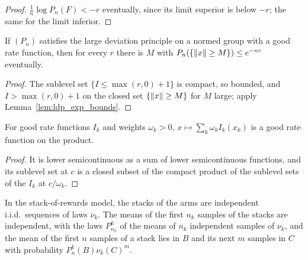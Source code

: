 \begin{proof}
  \leanok
  $\frac1n \log P_n(F) < -r$ eventually, since its limit superior is below $-r$; the same for the
  limit inferior.
\end{proof}

\begin{lemma}
  \label{lem:exp_tight}
  \leanok
  If $(P_n)$ satisfies the large deviation principle on a normed group with a good rate function,
  then for every $r$ there is $M$ with $P_n(\{\lVert x \rVert \ge M\}) \le e^{-n r}$ eventually.
\end{lemma}

\begin{proof}
  \leanok
  The sublevel set $\{I \le \max(r, 0) + 1\}$ is compact, so bounded, and $I > \max(r, 0) + 1$ on
  the closed set $\{\lVert x \rVert \ge M\}$ for $M$ large; apply Lemma~\ref{lem:ldp_exp_bounds}.
\end{proof}

\begin{lemma}
  \label{lem:good_rate_sum}
  \leanok
  For good rate functions $I_k$ and weights $\omega_k > 0$, $x \mapsto \sum_k \omega_k I_k(x_k)$
  is a good rate function on the product.
\end{lemma}

\begin{proof}
  \leanok
  It is lower semicontinuous as a sum of lower semicontinuous functions, and its sublevel set at
  $c$ is a closed subset of the compact product of the sublevel sets of the $I_k$ at
  $c / \omega_k$.
\end{proof}

\begin{lemma}
  \label{lem:stream_rows}
  \leanok
  In the stack-of-rewards model, the stacks of the arms are independent i.i.d.\ sequences of laws
  $\nu_k$. The means of the first $n_k$ samples of the stacks are independent, with the laws
  $P^k_{n_k}$ of the means of $n_k$ independent samples of $\nu_k$, and the mean of the first $n$
  samples of a stack lies in $B$ and its next $m$ samples in $C$ with probability
  $P^k_n(B) \nu_k(C)^m$.
\end{lemma}

